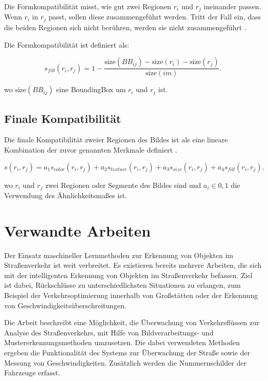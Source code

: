 Die Formkompatibilität misst, wie gut zwei Regionen $r_i$ und $r_j$ ineinander passen. Wenn $r_i$ in $r_j$ passt, sollen diese zusammengeführt werden. Tritt der Fall ein, dass die beiden Regionen sich nicht berühren, werden sie nicht zusammengeführt \cite{learnopencv}. 

Die Formkompatibilität ist definiert als:

\begin{equation}
	s_{fill}(r_{i},r_{j}) = 1 - \frac{\text{size}(BB_{ij}) - \text{size}(r_i) - \text{size}(r_j)}{\text{size}(im)}.
\end{equation}

wo $\text{size}(BB_{ij})$ eine \gls{BoundingBox} um $r_i$ und $r_j$ ist. 

\subsection*{Finale Kompatibilität}

Die finale Kompatibilität zweier Regionen des Bildes ist als eine lineare Kombination der zuvor genannten Merkmale definiert \cite{learnopencv}.

\begin{equation}
	s(r_{i},r_{j}) = a_1 s_{color}(r_i,r_j) + a_2 s_{texture}(r_i,r_j) + a_3 s_{size}(r_i,r_j) + a_4 s_{fill}(r_i,r_j).
\end{equation}

wo $r_i$ und $r_j$ zwei Regionen oder Segmente des Bildes sind und $a_i \in 0,1$ die Verwendung des Ähnlichkeitsmaßes ist.

\section{Verwandte Arbeiten}
Der Einsatz maschineller Lernmethoden zur Erkennung von Objekten im Straßenverkehr ist weit verbreitet.
Es existieren bereits mehrere Arbeiten, die sich mit der intelligenten Erkennung von Objekten im Straßenverkehr befassen. Ziel ist dabei, Rückschlüsse zu unterschiedlichsten Situationen zu erlangen, zum Beispiel der Verkehrsoptimierung innerhalb von Großstätten oder der Erkennung von Geschwindigkeitsüberschreitungen.

Die Arbeit \cite{Atkočiūnas_Blake_Juozapavičius_Kazimianec_2005} beschreibt eine Möglichkeit, die Überwachung von Verkehrsflüssen zur Analyse des Straßenverkehrs, mit Hilfe von Bildverarbeitungs- und Mustererkennungsmethoden umzusetzen. Die dabei verwendeten Methoden ergeben die Funktionalität des Systems zur Überwachung der Straße sowie der Messung von Geschwindigkeiten. Zusätzlich werden die Nummernschilder der Fahrzeuge erfasst.


